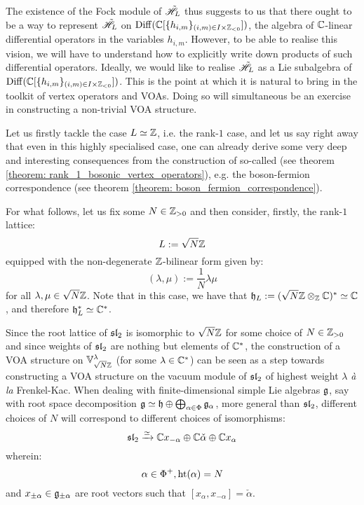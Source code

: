             The existence of the Fock module of $\tilde{\scrH}_L$ thus suggests to us that there ought to be a way to represent $\tilde{\scrH}_L$ on $\Diff(\bbC[ \{h_{i, m}\}_{(i, m) \in I \x \Z_{< 0}} ])$, the algebra of $\bbC$-linear differential operators in the variables $h_{i, m}$. However, to be able to realise this vision, we will have to understand how to explicitly write down products of such differential operators. Ideally, we would like to realise $\tilde{\scrH}_L$ as a Lie subalgebra of $\Diff(\bbC[ \{h_{i, m}\}_{(i, m) \in I \x \Z_{< 0}} ])$. This is the point at which it is natural to bring in the toolkit of vertex operators and VOAs. Doing so will simultaneous be an exercise in constructing a non-trivial VOA structure.

            Let us firstly tackle the case $L \cong \Z$, i.e. the rank-$1$ case, and let us say right away that even in this highly specialised case, one can already derive some very deep and interesting consequences from the construction of so-called  (see theorem \ref{theorem: rank_1_bosonic_vertex_operators}), e.g. the boson-fermion correspondence (see theorem \ref{theorem: boson_fermion_correspondence}).
            
            For what follows, let us fix some $N \in \Z_{> 0}$ and then consider, firstly, the rank-$1$ lattice:
                $$L := \sqrt{N} \Z$$
            equipped with the non-degenerate $\Z$-bilinear form given by:
                $$(\lambda, \mu) := \frac1N \lambda \mu$$
            for all $\lambda, \mu \in \sqrt{N} \Z$. Note that in this case, we have that $\h_L := (\sqrt{N}\Z \tensor_{\Z} \bbC)^* \cong \bbC$, and therefore $\h_L^* \cong \bbC^*$.
            \begin{remark}
                Since the root lattice of $\sl_2$ is isomorphic to $\sqrt{N} \Z$ for some choice of $N \in \Z_{> 0}$ and since weights of $\sl_2$ are nothing but elements of $\bbC^*$, the construction of a VOA structure on $\V_{\sqrt{N} \Z}^{\lambda}$ (for some $\lambda \in \bbC^*$) can be seen as a step towards constructing a VOA structure on the vacuum module of $\sl_2$ of highest weight $\lambda$ \textit{\`a la} Frenkel-Kac. When dealing with finite-dimensional simple Lie algebras $\g$, say with root space decomposition $\g \cong \h \oplus \bigoplus_{\alpha \in \Phi} \g_{\alpha}$, more general than $\sl_2$, different choices of $N$ will correspond to different choices of isomorphisms:
                    $$\sl_2 \xrightarrow[]{\cong} \bbC x_{-\alpha} \oplus \bbC \check{\alpha} \oplus \bbC x_{\alpha}$$
                wherein:
                    $$\alpha \in \Phi^+, \height(\alpha) = N$$
                and $x_{\pm \alpha} \in \g_{\pm \alpha}$ are root vectors such that $[x_{\alpha}, x_{-\alpha}] = \check{\alpha}$.
            \end{remark}

